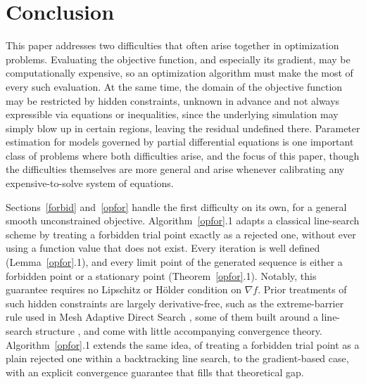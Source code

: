 \documentclass{article}
\begin{document}
\section{Conclusion} \label{conclusions}

This paper addresses two difficulties that often arise together in
optimization problems. Evaluating the objective function, and
especially its gradient, may be computationally expensive, so an
optimization algorithm must make the most of every such evaluation. At
the same time, the domain of the objective function may be restricted
by hidden constraints, unknown in advance and not always expressible
via equations or inequalities, since the underlying simulation may
simply blow up in certain regions, leaving the residual undefined
there. Parameter estimation for models governed by partial
differential equations is one important class of problems where both
difficulties arise, and the focus of this paper, though the
difficulties themselves are more general and arise whenever
calibrating any expensive-to-solve system of equations.

Sections~\ref{forbid} and~\ref{opfor} handle the first difficulty on
its own, for a general smooth unconstrained objective. Algorithm~\ref{opfor}.1
adapts a classical line-search scheme by treating a forbidden trial
point exactly as a rejected one, without ever using a function value
that does not exist. Every iteration is well defined
(Lemma~\ref{opfor}.1), and every limit point of the generated sequence
is either a forbidden point or a stationary point
(Theorem~\ref{opfor}.1). Notably, this guarantee requires no
Lipschitz or H\"older condition on $\nabla f$. Prior treatments of
such hidden constraints are largely derivative-free, such as the
extreme-barrier rule used in Mesh Adaptive Direct Search
\cite{mads,audetdennis,bcls,LeDigabelWild2024,rz}, some of them built
around a line-search structure \cite{fllr,GrattonVicente2014}, and
come with little accompanying convergence theory. Algorithm~\ref{opfor}.1
extends the same idea, of treating a forbidden trial point as a plain
rejected one within a backtracking line search, to the gradient-based
case, with an explicit convergence guarantee that fills that
theoretical gap.
\end{document}
